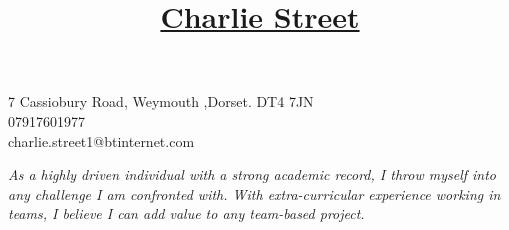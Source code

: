 \documentclass[11pt]{article}
\title{\vspace{-80pt}\underline{Charlie Street}}
\date{}
\begin{document}
	\maketitle
	\vspace*{-60pt}
	\begin{flushright}
		\noindent
		\large7 Cassiobury Road, Weymouth ,Dorset. DT4 7JN\\                             
		\large 07917601977\\
          		 \large charlie.street1@btinternet.com
	\end{flushright}
	

	\vspace{-15pt}
	\begin{center}
			\textit{\large As a highly driven individual with a strong academic record, I throw myself into any challenge I am confronted with. With extra-curricular experience working in teams, I believe I can add value to any team-based project.}
	\end{center}
			
\end{document}
